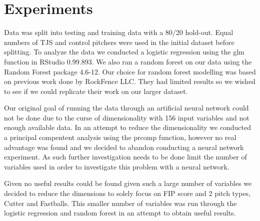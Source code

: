 \section{Experiments}

Data was split into testing and training data with a 80/20 hold-out. Equal numbers of TJS and control pitchers were used in the initial dataset before splitting. To analyze the data we conducted a logistic regression using the glm function in RStudio 0.99.893. We also ran a random forest on our data using the Random Forest package 4.6-12. Our choice for random forest modelling was based on previous work done by RockFence LLC. They had limited results so we wished to see if we could replicate their work on our larger dataset.

Our original goal of running the data through an artificial neural network could not be done due to the curse of dimensionality with 156 input variables and not enough available data. In an attempt to reduce the dimensionality we conducted a principal compentent analysis using the prcomp function, however no real advantage was found and we decided to abandon conducting a neural network experiment. As such further investigation needs to be done limit the number of variables used in order to investigate this problem with a neural network.

Given no useful results could be found given such a large number of variables we decided to reduce the dimensions to solely focus on FIP score and 2 pitch types, Cutter and Fastballs. This smaller number of variables was run through the logistic regression and random forest in an attempt to obtain useful results.